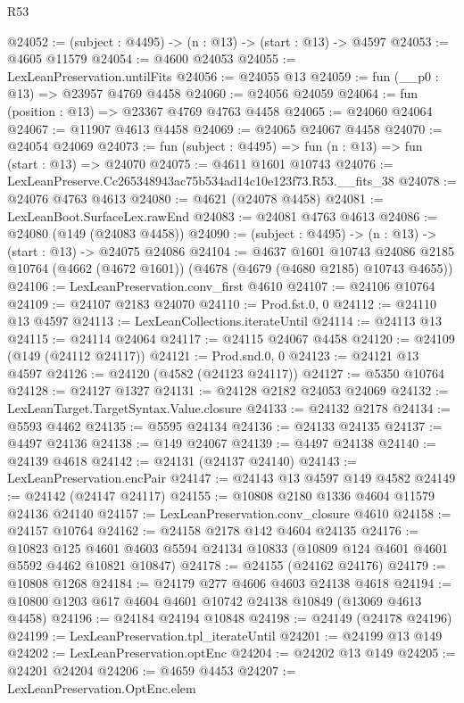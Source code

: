 \begin{lexlean}{R53}
\begin{coremodule}
@24052 := (subject : @4495) -> (n : @13) -> (start : @13) -> @4597
@24053 := @4605 @11579
@24054 := @4600 @24053
@24055 := LexLeanPreservation.untilFits
@24056 := @24055 @13
@24059 := fun (__p0 : @13) => @23957 @4769 @4458
@24060 := @24056 @24059
@24064 := fun (position : @13) => @23367 @4769 @4763 @4458
@24065 := @24060 @24064
@24067 := @11907 @4613 @4458
@24069 := @24065 @24067 @4458
@24070 := @24054 @24069
@24073 := fun (subject : @4495) => fun (n : @13) => fun (start : @13) => @24070
@24075 := @4611 @1601 @10743
@24076 := LexLeanPreserve.Cc265348943ac75b534ad14c10e123f73.R53.__fits_38
@24078 := @24076 @4763 @4613
@24080 := @4621 (@24078 @4458)
@24081 := LexLeanBoot.SurfaceLex.rawEnd
@24083 := @24081 @4763 @4613
@24086 := @24080 (@149 (@24083 @4458))
@24090 := (subject : @4495) -> (n : @13) -> (start : @13) -> @24075 @24086
@24104 := @4637
    @1601
    @10743
    @24086
    @2185
    @10764
    (@4662 (@4672 @1601))
    (@4678 (@4679 (@4680 @2185) @10743 @4655))
@24106 := LexLeanPreservation.conv_first @4610
@24107 := @24106 @10764
@24109 := @24107 @2183 @24070
@24110 := Prod.fst.{0, 0}
@24112 := @24110 @13 @4597
@24113 := LexLeanCollections.iterateUntil
@24114 := @24113 @13
@24115 := @24114 @24064
@24117 := @24115 @24067 @4458
@24120 := @24109 (@149 (@24112 @24117))
@24121 := Prod.snd.{0, 0}
@24123 := @24121 @13 @4597
@24126 := @24120 (@4582 (@24123 @24117))
@24127 := @5350 @10764
@24128 := @24127 @1327
@24131 := @24128 @2182 @24053 @24069
@24132 := LexLeanTarget.TargetSyntax.Value.closure
@24133 := @24132 @2178
@24134 := @5593 @4462
@24135 := @5595 @24134
@24136 := @24133 @24135
@24137 := @4497 @24136
@24138 := @149 @24067
@24139 := @4497 @24138
@24140 := @24139 @4618
@24142 := @24131 (@24137 @24140)
@24143 := LexLeanPreservation.encPair
@24147 := @24143 @13 @4597 @149 @4582
@24149 := @24142 (@24147 @24117)
@24155 := @10808 @2180 @1336 @4604 @11579 @24136 @24140
@24157 := LexLeanPreservation.conv_closure @4610
@24158 := @24157 @10764
@24162 := @24158 @2178 @142 @4604 @24135
@24176 := @10823
    @125
    @4601
    @4603
    @5594
    @24134
    @10833
    (@10809 @124 @4601 @4601 @5592 @4462 @10821 @10847)
@24178 := @24155 (@24162 @24176)
@24179 := @10808 @1268
@24184 := @24179 @277 @4606 @4603 @24138 @4618
@24194 := @10800 @1203 @617 @4604 @4601 @10742 @24138 @10849 (@13069 @4613 @4458)
@24196 := @24184 @24194 @10848
@24198 := @24149 (@24178 @24196)
@24199 := LexLeanPreservation.tpl_iterateUntil
@24201 := @24199 @13 @149
@24202 := LexLeanPreservation.optEnc
@24204 := @24202 @13 @149
@24205 := @24201 @24204
@24206 := @4659 @4453
@24207 := LexLeanPreservation.OptEnc.elem

\end{coremodule}
\end{lexlean}
